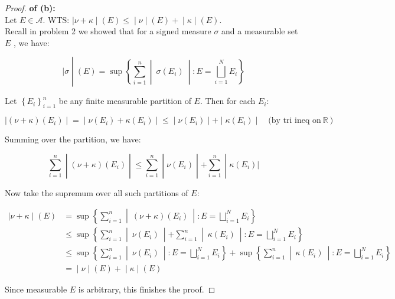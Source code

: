 \documentclass{qlnotes-export}
\begin{document}
\begin{proof}

\textbf{of (b):}\\
Let \(E \in \mathcal{A}\). WTS: \(\left. |\nu + \kappa \middle| (E) \leq \middle| \nu \middle| (E) + \middle| \kappa \middle| (E) \right.\).\\
Recall in problem 2 we showed that for a signed measure \(\sigma\) and a measurable set \(E\) , we have:

\[\left. |\sigma \middle| (E) = \sup\left\{ \sum\limits_{i = 1}^{n} \middle| \ \sigma(E_{i})\  \middle| :E = \bigsqcup\limits_{i = 1}^{N}E_{i} \right\} \right.\]

Let \(\left\{ E_{i} \right\}_{i = 1}^{n}\) be any finite measurable partition of \(E\). Then for each \(E_{i}\):

\[\left. |(\nu + \kappa)(E_{i}) \middle| = \middle| \nu(E_{i}) + \kappa(E_{i}) \middle| \leq \middle| \nu(E_{i}) \middle| + \middle| \kappa(E_{i}) \middle| \quad\text{(by tri ineq on}\ {\mathbb{R}}\ \text{)} \right.\]

Summing over the partition, we have:

\[\left. \sum\limits_{i = 1}^{n} \middle| (\nu + \kappa)(E_{i}) \middle| \leq \sum\limits_{i = 1}^{n} \middle| \nu(E_{i}) \middle| + \sum\limits_{i = 1}^{n} \middle| \kappa(E_{i})| \right.\]

Now take the supremum over all such partitions of \(E\):

\[\begin{matrix}
\left. |\nu + \kappa \middle| (E) \right. & {= \sup\left\{ \sum\limits_{i = 1}^{n} \middle| \ (\nu + \kappa)(E_{i})\  \middle| :E = \bigsqcup\limits_{i = 1}^{N}E_{i} \right\}} \\
 & {\leq \sup\left\{ \sum\limits_{i = 1}^{n} \middle| \ \nu(E_{i})\  \middle| + \sum\limits_{i = 1}^{n} \middle| \ \kappa(E_{i})\  \middle| :E = \bigsqcup\limits_{i = 1}^{N}E_{i} \right\}} \\
 & {\leq \sup\left\{ \sum\limits_{i = 1}^{n} \middle| \ \nu(E_{i})\  \middle| :E = \bigsqcup\limits_{i = 1}^{N}E_{i} \right\} + \sup\left\{ \sum\limits_{i = 1}^{n} \middle| \ \kappa(E_{i})\  \middle| :E = \bigsqcup\limits_{i = 1}^{N}E_{i} \right\}} \\
 & \left. = \middle| \nu \middle| (E) + \middle| \kappa \middle| (E) \right.
\end{matrix}\]

Since measurable \(E\) is arbitrary, this finishes the proof.

\end{proof}
\end{document}
